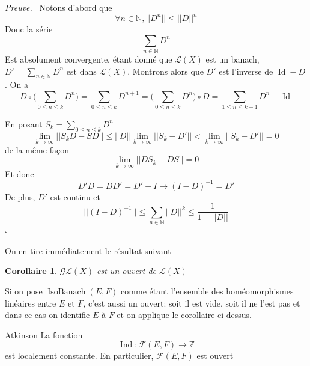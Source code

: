 \documentclass[a4paper,12pt,oneside,titlepage]{article}
\theoremstyle{definition}
\theoremstyle{plain}
\newtheorem{corollaire}[definition]{Corollaire}
\newenvironment{preuve}
{\par\noindent\textit{Preuve.}\ }
{\hfill$\square$\par}
\begin{document}
\begin{preuve}
    Notons d'abord que 
    \begin{equation*}
        \forall n\in\mathbb{N}, ||D^n||\leq ||D||^n 
    \end{equation*}
    Donc la série
    \begin{equation*}
        \sum_{n\in\mathbb{N}} D^n
    \end{equation*}
    Est absolument convergente, étant donné que $\mathcal{L}(X)$ est un banach, $D'=\sum_{n\in\mathbb{N}} D^n$ est dans $\mathcal{L}(X)$. 
    Montrons alors que $D'$ est l'inverse de $\operatorname{Id} -D$.
    On a
    \begin{equation*}
        D\circ\big( \sum_{0\leq n\leq k} D^n\big)=\sum_{0\leq n\leq k} D^{n+1}=\big( \sum_{0\leq n\leq k} D^n\big)\circ D = \sum_{1\leq n\leq k+1} D^n- \operatorname{Id}
    \end{equation*}

    En posant $S_k=\sum_{0\leq n\leq k} D^n$
    \begin{equation*}
        \lim_{k\rightarrow \infty} ||S_kD -SD||\leq 
        ||D||\lim_{k\rightarrow \infty}  ||S_k-D'||< \lim_{k\rightarrow \infty}  ||S_k-D'||=0
    \end{equation*}
    de la même façon 
    \begin{equation*}
        \lim_{k\rightarrow \infty} ||DS_k -DS||=0
    \end{equation*}
    Et donc
    \begin{equation*}
        D'D=DD'=D'-I\rightarrow (I-D)^{-1}=D'
    \end{equation*}
    De plus, $D'$ est continu et
    \begin{equation*}
        ||(I-D)^{-1}||\leq \sum_{n\in\mathbb{N}} ||D||^k \leq  \frac{1}{1-||D||}
    \end{equation*}
\end{preuve}
On en tire immédiatement le résultat suivant
\begin{corollaire}\label{iso-ouverts}
    $\mathcal{GL}(X)$ est un ouvert de $\mathcal{L}(X)$
\end{corollaire}
Si on pose $\operatorname*{IsoBanach}(E,F)$ comme étant l'ensemble des homéomorphismes linéaires entre $E$ et $F$, c'est aussi un ouvert: soit il est vide, soit il ne l'est pas et dans ce cas on identifie $E$ à $F$ et on applique le corollaire ci-dessus.
\begin{theobox}{Atkinson}{}
    La fonction 
    \begin{equation*}
        \operatorname{Ind}: \mathcal{F}(E,F)\rightarrow \mathbb{Z}
    \end{equation*}
    est localement constante. En particulier, $\mathcal{F}(E,F)$ est ouvert
\end{theobox}
\end{document}
